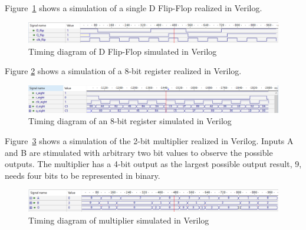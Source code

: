 Figure~\ref{fig:dflipflop_sim} shows a simulation of a single D Flip-Flop realized in Verilog.

\begin{figure}[H]
    \centering
    \includegraphics[width=\textwidth]{Figures/Test of Dflipflop.png}
    \caption{Timing diagram of D Flip-Flop simulated in Verilog}
    \label{fig:dflipflop_sim}
\end{figure}

Figure \ref{fig:8bitregister_sim} shows a simulation of a 8-bit register realized in Verilog.

\begin{figure}[H]
    \centering
    \includegraphics[width=\textwidth]{Figures/VerilogPlot_8bitreg.png}
    \caption{Timing diagram of an 8-bit register simulated in Verilog}
    \label{fig:8bitregister_sim}
\end{figure}

Figure~\ref{fig:multiplier_sim} shows a simulation of the 2-bit multiplier realized in Verilog. Inputs A and B are stimulated with arbitrary two bit values to observe the possible outputs. The multiplier has a 4-bit output as the largest possible output result, 9, needs four bits to be represented in binary.

\begin{figure}[H]
    \centering
    \includegraphics[width=\textwidth]{Figures/Test of multiplier.png}
    \caption{Timing diagram of multiplier simulated in Verilog}
    \label{fig:multiplier_sim}
\end{figure}




